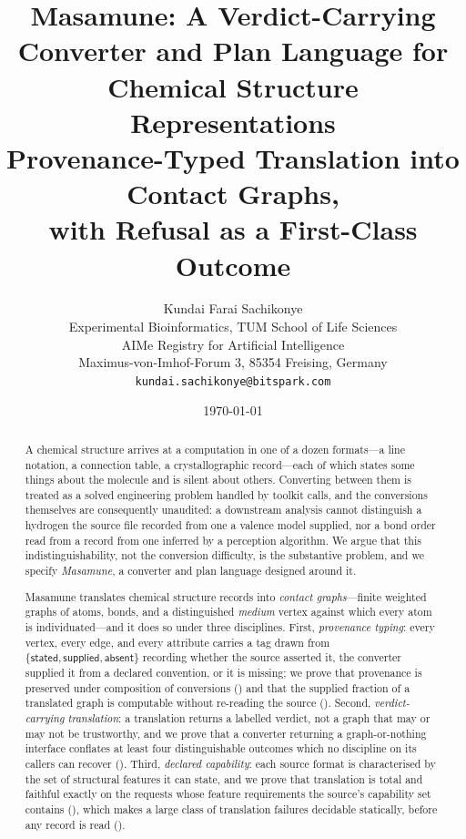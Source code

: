 \documentclass[11pt,twocolumn,a4paper]{article}
\title{\textbf{Masamune: A Verdict-Carrying Converter and Plan
Language for Chemical Structure Representations}\\[6pt]
\large Provenance-Typed Translation into Contact Graphs,\\
with Refusal as a First-Class Outcome}
\author{%
Kundai Farai Sachikonye\\[0.3em]
\normalsize Experimental Bioinformatics, TUM School of Life Sciences\\
\normalsize AIMe Registry for Artificial Intelligence \\
\normalsize Maximus-von-Imhof-Forum 3, 85354 Freising, Germany\\
\normalsize \texttt{kundai.sachikonye@bitspark.com}}
\date{\today}
\theoremstyle{msthm}
\theoremstyle{definition}
\theoremstyle{remark}
\newcommand{\stated}{\textsf{stated}}
\newcommand{\supplied}{\textsf{supplied}}
\newcommand{\absent}{\textsf{absent}}
\begin{document}
\maketitle

\tableofcontents

\begin{abstract}
\noindent
A chemical structure arrives at a computation in one of a dozen
formats---a line notation, a connection table, a crystallographic
record---each of which states some things about the molecule and is
silent about others. Converting between them is treated as a solved
engineering problem handled by toolkit calls, and the conversions
themselves are consequently unaudited: a downstream analysis cannot
distinguish a hydrogen the source file recorded from one a valence model
supplied, nor a bond order read from a record from one inferred by a
perception algorithm. We argue that this indistinguishability, not the
conversion difficulty, is the substantive problem, and we specify
\emph{Masamune}, a converter and plan language designed around it.

Masamune translates chemical structure records into \emph{contact
graphs}---finite weighted graphs of atoms, bonds, and a distinguished
\emph{medium} vertex against which every atom is individuated---and it
does so under three disciplines. First, \emph{provenance typing}: every
vertex, every edge, and every attribute carries a tag drawn from
$\{\stated, \supplied, \absent\}$ recording whether the source asserted
it, the converter supplied it from a declared convention, or it is
missing; we prove that provenance is preserved under composition of
conversions () and that the supplied fraction of
a translated graph is computable without re-reading the source
(). Second, \emph{verdict-carrying
translation}: a translation returns a labelled verdict, not a graph
that may or may not be trustworthy, and we prove that a converter
returning a graph-or-nothing interface conflates at least four
distinguishable outcomes which no discipline on its callers can recover
(). Third, \emph{declared capability}: each source
format is characterised by the set of structural features it can state,
and we prove that translation is total and faithful exactly on the
requests whose feature requirements the source's capability set contains
(), which makes a large class of translation
failures decidable statically, before any record is read
().


\end{abstract}
\end{document}
